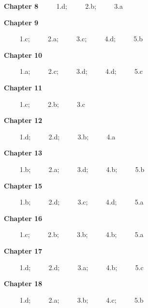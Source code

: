 \documentclass[
]{book}
\begin{document}
\textbf{Chapter 8}
\(\qquad\) 1.d; \(\qquad\) 2.b; \(\qquad\) 3.a

\textbf{Chapter 9}

\(\qquad\) 1.c; \(\qquad\) 2.a; \(\qquad\) 3.c; \(\qquad\) 4.d; \(\qquad\) 5.b

\textbf{Chapter 10}

\(\qquad\) 1.a; \(\qquad\) 2.c; \(\qquad\) 3.d; \(\qquad\) 4.d; \(\qquad\) 5.c

\textbf{Chapter 11}

\(\qquad\) 1.c; \(\qquad\) 2.b; \(\qquad\) 3.c

\textbf{Chapter 12}

\(\qquad\) 1.d; \(\qquad\) 2.d; \(\qquad\) 3.b; \(\qquad\) 4.a

\textbf{Chapter 13}

\(\qquad\) 1.b; \(\qquad\) 2.a; \(\qquad\) 3.d; \(\qquad\) 4.b; \(\qquad\) 5.b

\textbf{Chapter 15}

\(\qquad\) 1.b; \(\qquad\) 2.d; \(\qquad\) 3.c; \(\qquad\) 4.d; \(\qquad\) 5.a

\textbf{Chapter 16}

\(\qquad\) 1.c; \(\qquad\) 2.b; \(\qquad\) 3.b; \(\qquad\) 4.b; \(\qquad\) 5.a

\textbf{Chapter 17}

\(\qquad\) 1.d; \(\qquad\) 2.d; \(\qquad\) 3.a; \(\qquad\) 4.b; \(\qquad\) 5.c

\textbf{Chapter 18}

\(\qquad\) 1.d; \(\qquad\) 2.a; \(\qquad\) 3.b; \(\qquad\) 4.c; \(\qquad\) 5.b

  
\end{document}
